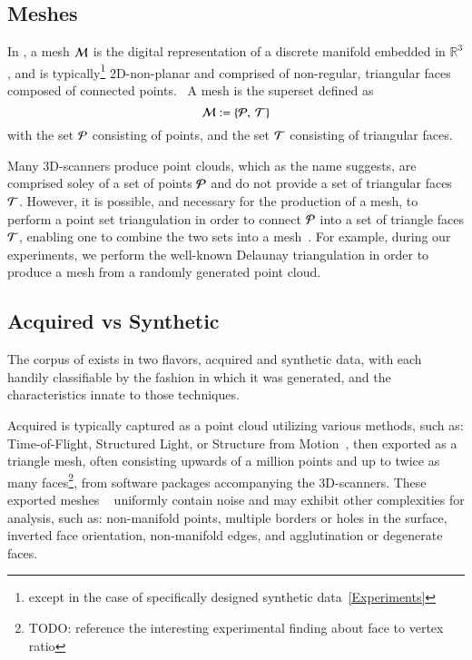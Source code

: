 \subsection{Meshes}
\label{ch2s3ssM}
In \tdd{}, a mesh $\mathcal{M}$ is the digital representation of a discrete manifold embedded in $\mathbb{R}^3$, and is typically\footnote{except in the case of specifically designed synthetic data~\ref{Experiments}} 2D-non-planar and comprised of non-regular, triangular faces composed of connected points.~\cite[p.~25]{Mara12} A mesh is the superset defined as
\begin{equation}
	\mathcal{M} := \left \{\mathcal{P},\:\mathcal{T}\right \}
	\label{eq:defineMesh}
\end{equation}%
%
with the set $\mathcal{P}$ consisting of points, and the set $\mathcal{T}$ consisting of triangular faces.

Many 3D-scanners produce point clouds\todoCitation{}{}, which as the name suggests, are comprised soley of a set of points $\mathcal{P}$ and do not provide a set of triangular faces $\mathcal{T}$. However, it is possible, and necessary for the production of a mesh, to perform a point set triangulation\todoCitation{}{} in order to connect $\mathcal{P}$ into a set of triangle faces $\mathcal{T}$, enabling one to combine the two sets into a mesh~\cite[p.~26]{Mara12}. For example, during our experiments, we perform the well-known Delaunay triangulation\todoCitation{} in order to produce a mesh from a randomly generated point cloud.
%
\subsection{Acquired vs Synthetic \tdd{}}
\label{ch2s3ssAVS3}
The corpus of \tdd{} exists in two flavors, acquired and synthetic data, with each handily classifiable by the fashion in which it was generated, and the characteristics innate to those techniques.

Acquired \tdd{} is typically captured as a point cloud utilizing various methods, such as: Time-of-Flight, Structured Light, or Structure from Motion~\cite[p.~19]{Mara12}, then exported as a triangle mesh, often consisting upwards of a million points and up to twice as many faces\footnote{TODO: reference the interesting experimental finding about face to vertex ratio}, from software packages accompanying the 3D-scanners. These exported meshes ~\cite[p.~25]{Mara12} uniformly contain noise and may exhibit other complexities for analysis, such as: non-manifold points, multiple borders or holes in the surface, inverted face orientation, non-manifold edges, and agglutination or degenerate faces. ~\cite[p.~28-32]{Mara12}

